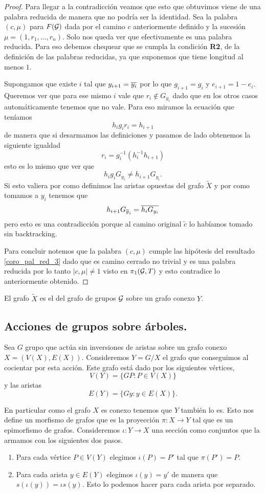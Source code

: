 \documentclass[tesis.tex]{subfiles}
\begin{document}
\begin{proof}
	Para llegar a la contradicción veamos que esto que obtuvimos viene de una palabra reducida de manera que no podría ser la identidad.
	Sea la palabra $(c, \mu)$ para $F({\cal G})$ dada por el camino $c$ anteriormente definido y la sucesión $\mu = (1,r_1, \dots, r_n)$.
	Solo nos queda ver que efectivamente es una palabra reducida. 
	Para eso debemos chequear que se cumpla la condición \textbf{R2}, de la definición de las palabras reducidas, ya que suponemos que tiene longitud al menos $1$.
	
	Supongamos que existe $i$ tal que $y_{i+1} = \overline{y_i}$ por lo que $g_{i+1} = g_{i}$ y $e_{i+1} = 1 - e_i$.
	Queremos ver que para ese mismo $i$ vale que $r_i \notin G_{y_i}$ dado que en los otros casos automáticamente tenemos que no vale.
	Para eso miramos la ecuación que teníamos 
	\[
		h_ig_ir_i = h_{i+1}
	\]
	de manera que si desarmamos las definiciones y pasamos de lado obtenemos la siguiente igualdad
	\[
		r_i =   g_i^{-1}(h_i^{-1} h_{i+1} )
	\]
	esto es lo mismo que ver que 
	\[
		h_ig_i G_{y_i} \neq  h_{i+1}G_{y_i}.
	\]
	Si esto valiera por como definimos las aristas opuestas del grafo $\tilde X$ y por como tomamos a $y_i$ tenemos que 
	\[
	h_{i+1}G_{\overline y_{i}} = \overline{h_{i}G_{y_i}}
	\]
	pero esto es una contradicción porque al camino original $\tilde c$ lo habíamos tomado sin backtracking.
	
	Para concluir notemos que la palabra $(c, \mu)$ cumple las hipótesis del resultado \ref{coro_pal_red_3} dado que es camino cerrado no trivial y es una palabra reducida por lo tanto $|c, \mu| \neq 1$ visto en $\pi_1({\cal G}, T)$ y esto contradice lo anteriormente obtenido.
\end{proof}


\begin{deff}
	El grafo $\tilde X$ es el  del grafo de grupos ${\cal G}$ sobre un grafo conexo $Y$.
\end{deff}
\subsection{Acciones de grupos sobre árboles.}

Sea $G$ grupo que actúa sin inversiones de aristas sobre un grafo conexo $X = (V(X),E(X))$.
Consideremos $Y = G / X$ el grafo que conseguimos al cocientar por esta acción.
Este grafo está dado por los siguientes vértices,
\[
	V(Y) = \{ G P :  P \in V(X)    \}
\]
y las  aristas 
\[
	E(Y) = \{  Gy  : y \in E(X)  \}.
\]

En particular como el grafo $X$ es conexo tenemos que $Y$ también lo es.
Esto nos define un morfismo de grafos que es la proyección $\pi: X \to Y$ tal que es un epimorfismo de grafos.
Consideremos $\iota: Y \to X$ una sección como conjuntos que la armamos con los siguientes dos pasos.
\begin{enumerate}
	\item Para cada vértice $P \in V(Y)$ elegimos $\iota (P) = P'$ tal que $\pi(P') = P$.
	\item Para cada arista $y \in E(Y)$ elegimos $\iota(y) = y'$ de manera que $s(\iota(y)) = \iota s(y)$. 
	Esto lo podemos hacer para cada arista por separado.
\end{enumerate}
\end{document}
